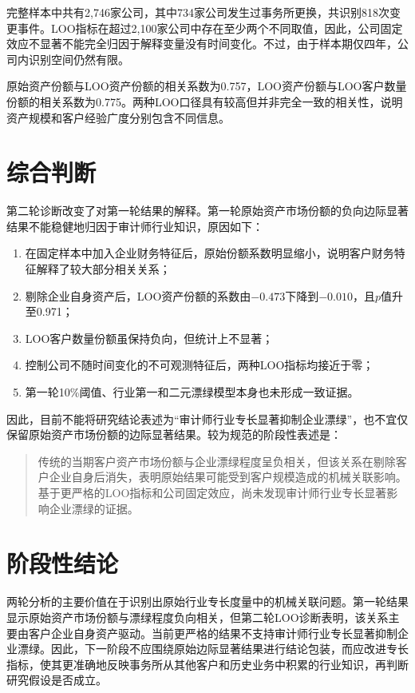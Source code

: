 \documentclass[12pt,a4paper]{article}
\begin{document}
完整样本中共有2,746家公司，其中734家公司发生过事务所更换，共识别818次变更事件。LOO指标在超过2,100家公司中存在至少两个不同取值，因此，公司固定效应不显著不能完全归因于解释变量没有时间变化。不过，由于样本期仅四年，公司内识别空间仍然有限。

原始资产份额与LOO资产份额的相关系数为0.757，LOO资产份额与LOO客户数量份额的相关系数为0.775。两种LOO口径具有较高但并非完全一致的相关性，说明资产规模和客户经验广度分别包含不同信息。

\section{综合判断}

第二轮诊断改变了对第一轮结果的解释。第一轮原始资产市场份额的负向边际显著结果不能稳健地归因于审计师行业知识，原因如下：

\begin{enumerate}
  \item 在固定样本中加入企业财务特征后，原始份额系数明显缩小，说明客户财务特征解释了较大部分相关关系；
  \item 剔除企业自身资产后，LOO资产份额的系数由$-0.473$下降到$-0.010$，且$p$值升至0.971；
  \item LOO客户数量份额虽保持负向，但统计上不显著；
  \item 控制公司不随时间变化的不可观测特征后，两种LOO指标均接近于零；
  \item 第一轮10\%阈值、行业第一和二元漂绿模型本身也未形成一致证据。
\end{enumerate}

因此，目前不能将研究结论表述为“审计师行业专长显著抑制企业漂绿”，也不宜仅保留原始资产市场份额的边际显著结果。较为规范的阶段性表述是：

\begin{quote}
传统的当期客户资产市场份额与企业漂绿程度呈负相关，但该关系在剔除客户企业自身后消失，表明原始结果可能受到客户规模造成的机械关联影响。基于更严格的LOO指标和公司固定效应，尚未发现审计师行业专长显著影响企业漂绿的证据。
\end{quote}

\section{阶段性结论}

两轮分析的主要价值在于识别出原始行业专长度量中的机械关联问题。第一轮结果显示原始资产市场份额与漂绿程度负向相关，但第二轮LOO诊断表明，该关系主要由客户企业自身资产驱动。当前更严格的结果不支持审计师行业专长显著抑制企业漂绿。因此，下一阶段不应围绕原始边际显著结果进行结论包装，而应改进专长指标，使其更准确地反映事务所从其他客户和历史业务中积累的行业知识，再判断研究假设是否成立。
\end{document}
